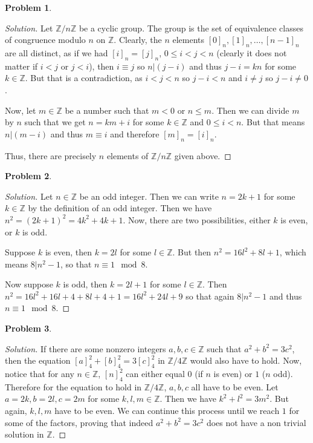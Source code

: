 \documentclass{article}
\theoremstyle{definition}
\newtheorem{problem-internal}{Problem}[subsection]
\newenvironment{problem}{
	\medskip
	\begin{problem-internal}
	}{
\end{problem-internal}
}
\newenvironment{solution}{
	\begin{proof}[Solution]
		\vspace{-8px}
		\setlength{\parskip}{4px}
		\setlength{\parindent}{0px}
	}{
\end{proof}
}
\begin{document}
\begin{problem}
\end{problem}

\begin{solution}
	Let $\mathbb{Z}/n\mathbb{Z}$ be a cyclic group. The group is the set of equivalence classes of congruence modulo $n$ on $\mathbb{Z}$. Clearly, the $n$ elements $[0]_n,[1]_n,\dots,[n-1]_n$ are all distinct, as if we had $[i]_n = [j]_n$, $0 \leq i < j < n$ (clearly it does not matter if $i < j$ or $j < i$), then $i \equiv j$ so $n | (j - i)$ and thus $j - i = kn$ for some $k \in \mathbb{Z}$. But that is a contradiction, as $i < j < n$ so $j - i < n$ and $i \neq j$ so $j - i \neq 0$.
	
	Now, let $m \in \mathbb{Z}$ be a number such that $m < 0$ or $n \leq m$. Then we can divide $m$ by $n$ such that we get $n = km + i$ for some $k \in \mathbb{Z}$ and $0 \leq i < n$. But that means $n | (m - i)$ and thus $m \equiv i$ and therefore $[m]_n = [i]_n$.
	
	Thus, there are precisely $n$ elements of $\mathbb{Z}/n\mathbb{Z}$ given above.
\end{solution}

\begin{problem}
\end{problem}

\begin{solution}
	Let $n \in \mathbb{Z}$ be an odd integer. Then we can write $n=2k+1$ for some $k \in \mathbb{Z}$ by the definition of an odd integer. Then we have $n^2=(2k+1)^2=4k^2+4k+1$. Now, there are two possibilities, either $k$ is even, or $k$ is odd.
	
	Suppose $k$ is even, then $k = 2l$ for some $l \in \mathbb{Z}$. But then $n^2=16l^2+8l+1$, which means $8 | n^2-1$, so that $n \equiv 1 \mod 8$.
	
	Now suppose $k$ is odd, then $k=2l+1$ for some $l \in \mathbb{Z}$. Then $n^2=16l^2+16l+4+8l+4+1=16l^2+24l+9$ so that again $8 | n^2 - 1$ and thus $n \equiv 1 \mod 8$.
\end{solution}

\begin{problem}
\end{problem}

\begin{solution}
	If there are some nonzero integers $a, b, c \in \mathbb{Z}$ such that $a^2+b^2=3c^2$, then the equation $[a]^2_4+[b]^2_4=3[c]^2_4$ in $\mathbb{Z}/4\mathbb{Z}$ would also have to hold. Now, notice that for any $n \in \mathbb{Z}$, $[n]^2_4$ can either equal $0$ (if $n$ is even) or $1$ ($n$ odd). Therefore for the equation to hold in $\mathbb{Z}/4\mathbb{Z}$, $a, b, c$ all have to be even. Let $a=2k, b=2l, c=2m$ for some $k,l,m \in \mathbb{Z}$. Then we have $k^2+l^2=3m^2$. But again, $k,l,m$ have to be even. We can continue this process until we reach $1$ for some of the factors, proving that indeed $a^2+b^2=3c^2$ does not have a non trivial solution in $\mathbb{Z}$.
\end{solution}
\end{document}
